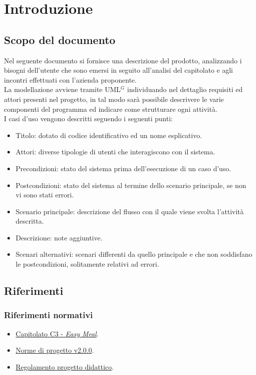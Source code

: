 \section{Introduzione}

\subsection{Scopo del documento}
Nel seguente documento si fornisce una descrizione del prodotto, analizzando i bisogni dell'utente che sono emersi in seguito all'analisi del capitolato e agli incontri effettuati con l'azienda proponente. \\
La modellazione avviene tramite UML$^G$ individuando nel dettaglio requisiti ed attori presenti nel progetto, in tal modo sarà possibile descrivere le varie componenti del programma ed indicare come strutturare ogni attività. \\

\noindent
I casi d'uso vengono descritti seguendo i seguenti punti:
\begin{itemize}
	\item Titolo: dotato di codice identificativo ed un nome esplicativo.
	\item Attori: diverse tipologie di utenti che interagiscono con il sistema.
	\item Precondizioni: stato del sistema prima dell'esecuzione di un caso d'uso.
	\item Postcondizioni: stato del sistema al termine dello scenario principale, se non vi sono stati errori.
	\item Scenario principale: descrizione del flusso con il quale viene svolta l'attività descritta.
	\item Descrizione: note aggiuntive.
	\item Scenari alternativi: scenari differenti da quello principale e che non soddisfano le postcondizioni, solitamente relativi ad errori.
\end{itemize}

\subsection{Riferimenti}
\subsubsection{Riferimenti normativi}
\begin{itemize}
    \item \href{https://www.math.unipd.it/~tullio/IS-1/2023/Progetto/C3.pdf}{Capitolato C3 - \textit{Easy Meal}}.
    \item \href{https://project-swenergy.github.io/}{Norme di progetto v2.0.0}.
    \item \href{https://www.math.unipd.it/~tullio/IS-1/2023/Dispense/PD2.pdf}{Regolamento progetto didattico}.
\end{itemize}

